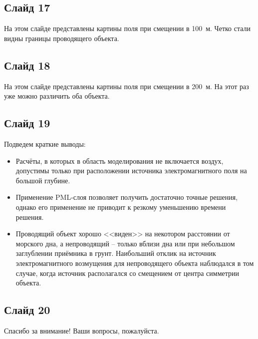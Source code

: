 \documentclass[a4paper,10pt]{article}
\begin{document}
\subsection*{Слайд 17}
На этом слайде представлены картины поля при смещении в 100~м. Четко стали видны границы проводящего объекта.

\subsection*{Слайд 18}
На этом слайде представлены картины поля при смещении в 200~м. На этот раз уже можно различить оба объекта.

\subsection*{Слайд 19}
Подведем краткие выводы:
\begin{itemize}
	\item Расчёты, в которых в область моделирования не включается воздух, допустимы только при расположении источника электромагнитного поля на большой глубине.
	\item Применение PML-слоя позволяет получить достаточно точные решения, однако его применение не приводит к резкому уменьшению времени решения.
	\item Проводящий объект хорошо <<виден>> на некотором расстоянии от морского дна, а непроводящий -- только вблизи дна или при небольшом заглублении приёмника в грунт. Наибольший отклик на источник электромагнитного возмущения для непроводящего объекта наблюдался в том случае, когда источник располагался со смещением от центра симметрии объекта.
\end{itemize}

\subsection*{Слайд 20}
Спасибо за внимание! Ваши вопросы, пожалуйста.
\end{document}
